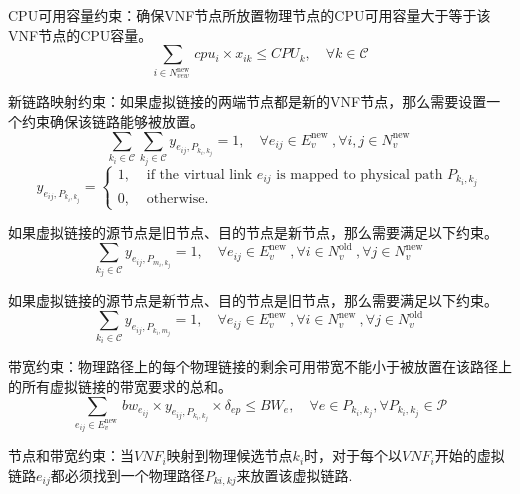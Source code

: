 CPU可用容量约束：确保VNF节点所放置物理节点的CPU可用容量大于等于该VNF节点的CPU容量。
\begin{equation}
    \sum_{i \in N_{v e w}^{\text {new }}} cpu_{i} \times x_{i k} \leq CPU_{k},\quad \forall k \in \mathcal{C} 
\end{equation}\par
新链路映射约束：如果虚拟链接的两端节点都是新的VNF节点，那么需要设置一个约束确保该链路能够被放置。
\begin{equation}
    \sum_{k_{i} \in \mathcal{C}} \sum_{k_{j} \in \mathcal{C}} y_{e_{i j}, P_{k_{i}, k_{j}}}=1,\quad \forall e_{i j} \in E_{v}^{\text {new }}, \forall i, j \in N_{v}^{\text {new }} 
\end{equation}
\begin{equation}
    y_{e_{i j}, P_{k_{i}, k_{j}}}=\left\{\begin{array}{ll}
        1, & \text { if the virtual link } e_{i j} \text { is mapped to physical path } P_{k_{i}, k_{j}} \\
        0, & \text { otherwise. }
        \end{array}\right.
\end{equation}\par
如果虚拟链接的源节点是旧节点、目的节点是新节点，那么需要满足以下约束。
\begin{equation}
    \sum_{k_{j} \in \mathcal{C}} y_{e_{i j}, P_{m_{i}, k_{j}}}=1,\quad \forall e_{i j} \in E_{v}^{\text {new }}, \forall i \in N_{v}^{\text {old }}, \forall j \in N_{v}^{\text {new }}
\end{equation}\par
如果虚拟链接的源节点是新节点、目的节点是旧节点，那么需要满足以下约束。
\begin{equation}
    \sum_{k_{i} \in \mathcal{C}} y_{e_{i j}, P_{k_{i}, m_{j}}}=1,\quad \forall e_{i j} \in E_{v}^{\text {new }}, \forall i \in N_{v}^{\text {new }}, \forall j \in N_{v}^{\text {old }} 
\end{equation}\par
带宽约束：物理路径上的每个物理链接的剩余可用带宽不能小于被放置在该路径上的所有虚拟链接的带宽要求的总和。
\begin{equation}
    \sum_{e_{i j} \in E_{v}^{\text {new }}} b w_{e_{i j}} \times y_{e_{i j}, P_{k_{i}, k_{j}}} \times \delta_{e p} \leq B W_{e},\quad \forall e \in P_{k_{i}, k_{j}}, \forall P_{k_{i}, k_{j}} \in \mathcal{P}
\end{equation}\par
节点和带宽约束：当$VNF_i$映射到物理候选节点$k_i$时，对于每个以$VNF_i$开始的虚拟链路$e_{ij}$都必须找到一个物理路径$P_{ki,kj}$来放置该虚拟链路.
